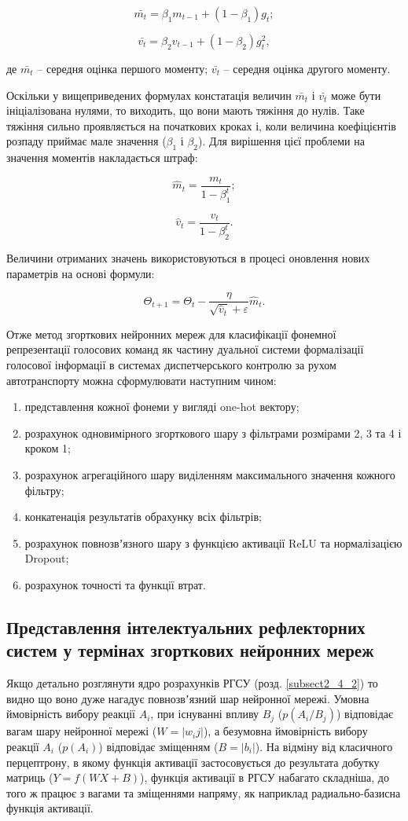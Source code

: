 \[
\bar{m_t}=\beta_1m_{t-1}+(1-\beta_1)g_t;
\]

\[
\bar{v_t}=\beta_2v_{t-1}+(1-\beta_2)g^2_t,
\]

\noindent
де $\bar{m_t}$ – середня оцінка першого моменту; $\bar{v_t}$ – середня оцінка другого моменту.

Оскільки у вищеприведених формулах констатація величин $\bar{m_t}$ і $\bar{v_t}$ може бути ініціалізована нулями, то виходить, що вони мають тяжіння до нулів. Таке тяжіння сильно проявляється на початкових кроках і, коли величина коефіцієнтів розпаду приймає мале значення ($\beta_1$ і $\beta_2$). Для вирішення цієї проблеми на значення моментів накладається штраф:

\[
\hat{m}_t=\frac{m_t}{1-\beta_1^t};
\]

\[
\hat{v}_t=\frac{v_t}{1-\beta_2^t}.
\]

Величини отриманих значень використовуються в процесі оновлення нових параметрів на основі формули:

\[
\Theta_{t+1}=\Theta_t-\frac{\eta}{\sqrt{\hat{v}_t}+\varepsilon}\hat{m}_t.
\]

Отже метод згорткових нейронних мереж для класифікації фонемної репрезентації голосових команд як частину дуальної системи формалізації голосової інформації в системах диспетчерського контролю за рухом автотранспорту можна сформулювати наступним чином:

\begin{enumerate}
	\item представлення кожної фонеми у вигляді one-hot вектору;
	\item розрахунок одновимірного згорткового шару з фільтрами розмірами 2, 3 та 4 і кроком 1;
	\item розрахунок агрегаційного шару виділенням максимального значення кожного фільтру;
	\item конкатенація результатів обрахунку всіх фільтрів;
	\item розрахунок повнозвʼязного шару з функцією активації ReLU та нормалізацією Dropout;
	\item розрахунок точності та функції втрат.
\end{enumerate}

\subsection{Представлення інтелектуальних рефлекторних систем у термінах згорткових нейронних мереж}

Якщо детально розглянути ядро розрахунків РГСУ (розд. \ref{subsect2_4_2}) то видно що воно дуже нагадує повнозвʼязний шар нейронної мережі. Умовна ймовірність вибору реакції $A_i$, при існуванні впливу $B_j$ ($p(A_i/B_j)$) відповідає вагам шару нейронної мережі ($W = |w_ij|$), а безумовна ймовірність вибору реакції $A_i$ ($p(A_i)$) відповідає зміщенням ($B = |b_i|$). На відміну від класичного перцептрону, в якому функція активації застосовується до результата добутку матриць ($Y=f(WX + B)$), функція активації в РГСУ набагато складніша, до того ж працює з вагами та зміщеннями напряму, як наприклад радиально-базисна функція активації.

